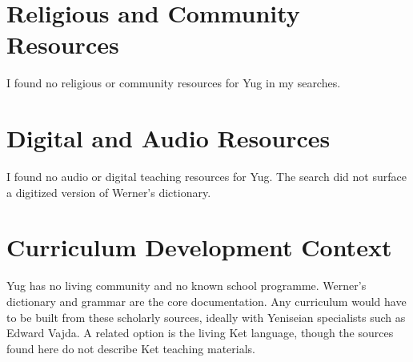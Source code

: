 \documentclass[12pt]{article}
\begin{document}
\section{Religious and Community Resources}
I found no religious or community resources for Yug in my searches.

\section{Digital and Audio Resources}
I found no audio or digital teaching resources for Yug. The search did not surface a digitized version of Werner's dictionary.

\section{Curriculum Development Context}
Yug has no living community and no known school programme. Werner's dictionary and grammar are the core documentation. Any curriculum would have to be built from these scholarly sources, ideally with Yeniseian specialists such as Edward Vajda. A related option is the living Ket language, though the sources found here do not describe Ket teaching materials.
\end{document}
